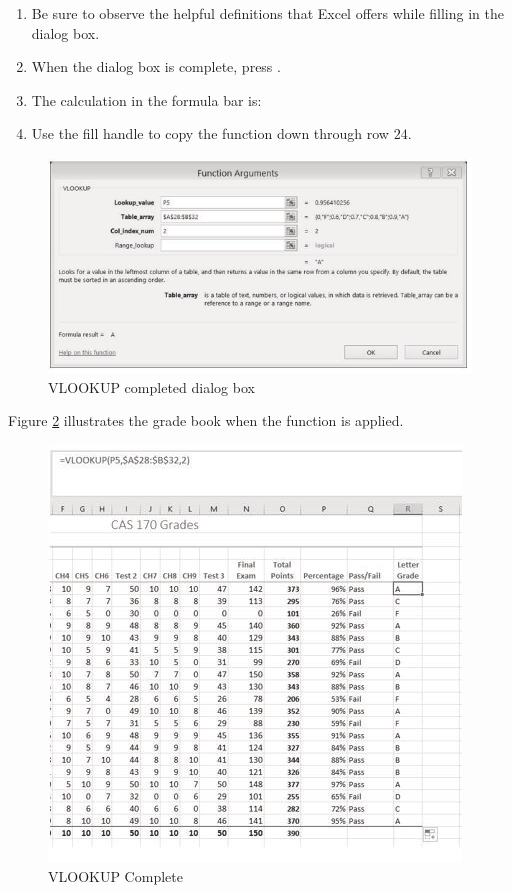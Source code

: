 \begin{enumerate}[resume]
	\item Be sure to observe the helpful definitions that Excel offers while filling in the  dialog box.
	\item When the dialog box is complete, press .
	\item The calculation in the formula bar is: 
	\item Use the fill handle to copy the function down through row $ 24 $.
\end{enumerate}

\begin{figure}[H]
	\centering
	\includegraphics[width=\maxwidth{.95\linewidth}]{gfx/ch03_fig13}
	\caption{VLOOKUP completed dialog box}
	\label{03:fig13}
\end{figure}

Figure \ref{03:fig14} illustrates the grade book when the  function is applied.

\begin{figure}[H]
	\centering
	\includegraphics[width=\maxwidth{.95\linewidth}]{gfx/ch03_fig14}
	\caption{VLOOKUP Complete}
	\label{03:fig14}
\end{figure}

